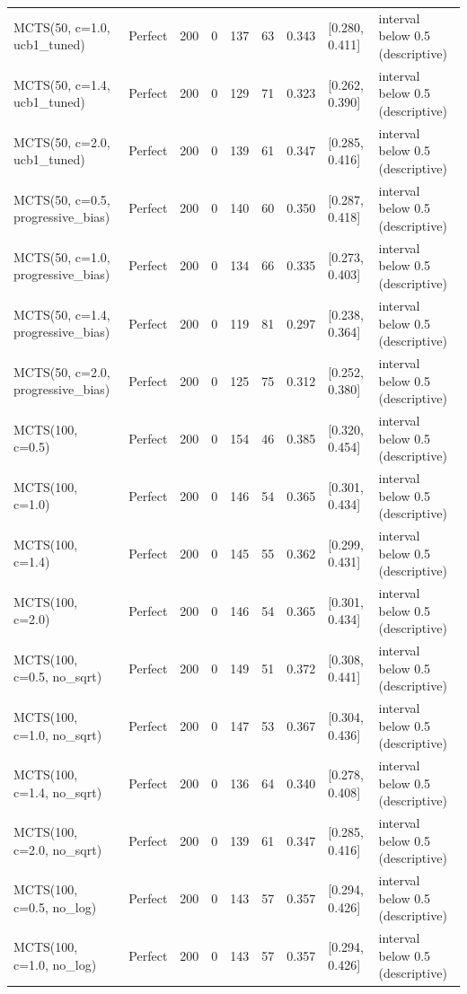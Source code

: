 \begin{table}[!t]
\begin{tabular}{llrrrrrll}
MCTS(50, c=1.0, ucb1\_tuned) & Perfect & 200 & 0 & 137 & 63 & 0.343 & [0.280, 0.411] & interval below 0.5 (descriptive) \\
MCTS(50, c=1.4, ucb1\_tuned) & Perfect & 200 & 0 & 129 & 71 & 0.323 & [0.262, 0.390] & interval below 0.5 (descriptive) \\
MCTS(50, c=2.0, ucb1\_tuned) & Perfect & 200 & 0 & 139 & 61 & 0.347 & [0.285, 0.416] & interval below 0.5 (descriptive) \\
MCTS(50, c=0.5, progressive\_bias) & Perfect & 200 & 0 & 140 & 60 & 0.350 & [0.287, 0.418] & interval below 0.5 (descriptive) \\
MCTS(50, c=1.0, progressive\_bias) & Perfect & 200 & 0 & 134 & 66 & 0.335 & [0.273, 0.403] & interval below 0.5 (descriptive) \\
MCTS(50, c=1.4, progressive\_bias) & Perfect & 200 & 0 & 119 & 81 & 0.297 & [0.238, 0.364] & interval below 0.5 (descriptive) \\
MCTS(50, c=2.0, progressive\_bias) & Perfect & 200 & 0 & 125 & 75 & 0.312 & [0.252, 0.380] & interval below 0.5 (descriptive) \\
MCTS(100, c=0.5) & Perfect & 200 & 0 & 154 & 46 & 0.385 & [0.320, 0.454] & interval below 0.5 (descriptive) \\
MCTS(100, c=1.0) & Perfect & 200 & 0 & 146 & 54 & 0.365 & [0.301, 0.434] & interval below 0.5 (descriptive) \\
MCTS(100, c=1.4) & Perfect & 200 & 0 & 145 & 55 & 0.362 & [0.299, 0.431] & interval below 0.5 (descriptive) \\
MCTS(100, c=2.0) & Perfect & 200 & 0 & 146 & 54 & 0.365 & [0.301, 0.434] & interval below 0.5 (descriptive) \\
MCTS(100, c=0.5, no\_sqrt) & Perfect & 200 & 0 & 149 & 51 & 0.372 & [0.308, 0.441] & interval below 0.5 (descriptive) \\
MCTS(100, c=1.0, no\_sqrt) & Perfect & 200 & 0 & 147 & 53 & 0.367 & [0.304, 0.436] & interval below 0.5 (descriptive) \\
MCTS(100, c=1.4, no\_sqrt) & Perfect & 200 & 0 & 136 & 64 & 0.340 & [0.278, 0.408] & interval below 0.5 (descriptive) \\
MCTS(100, c=2.0, no\_sqrt) & Perfect & 200 & 0 & 139 & 61 & 0.347 & [0.285, 0.416] & interval below 0.5 (descriptive) \\
MCTS(100, c=0.5, no\_log) & Perfect & 200 & 0 & 143 & 57 & 0.357 & [0.294, 0.426] & interval below 0.5 (descriptive) \\
MCTS(100, c=1.0, no\_log) & Perfect & 200 & 0 & 143 & 57 & 0.357 & [0.294, 0.426] & interval below 0.5 (descriptive) \\

\end{tabular}
\end{table}
